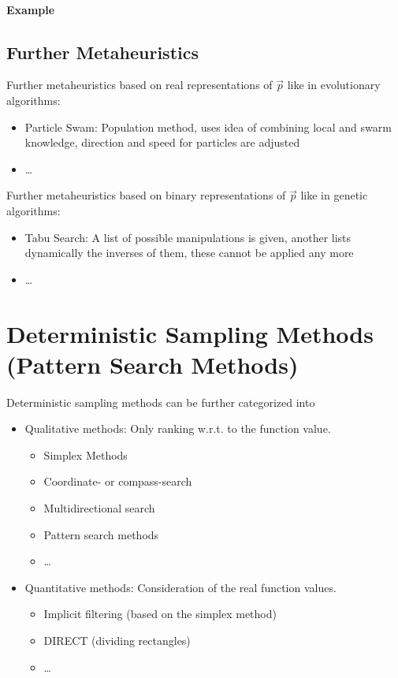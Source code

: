 			\paragraph{Example} %

		\subsection{Further Metaheuristics}
			Further metaheuristics based on real representations of \(\vec{p}\) like in evolutionary algorithms:
			\begin{itemize}
				\item Particle Swam: Population method, uses idea of combining local and swarm knowledge, direction and speed for particles are adjusted
				\item \dots
			\end{itemize}

			Further metaheuristics based on binary representations of \(\vec{p}\) like in genetic algorithms:
			\begin{itemize}
				\item Tabu Search: A list of possible manipulations is given, another lists dynamically the inverses of them, these cannot be applied any more
				\item \dots
			\end{itemize}

	\section{Deterministic Sampling Methods (Pattern Search Methods)}
		Deterministic sampling methods can be further categorized into
		\begin{itemize}
			\item Qualitative methods: Only ranking w.r.t. to the function value.
				\begin{itemize}
					\item Simplex Methods
					\item Coordinate- or compass-search
					\item Multidirectional search
					\item Pattern search methods
					\item \dots
				\end{itemize}
			\item Quantitative methods: Consideration of the real function values.
				\begin{itemize}
					\item Implicit filtering (based on the simplex method)
					\item DIRECT (dividing rectangles)
					\item \dots
				\end{itemize}
		\end{itemize}

